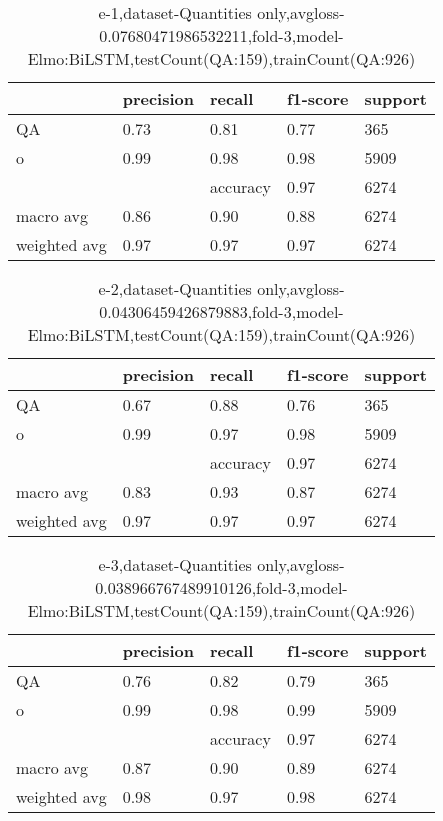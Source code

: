 \begin{table}[!ht] 
\centering
\caption{e-1,dataset-Quantities only,avgloss-0.07680471986532211,fold-3,model-Elmo:BiLSTM,testCount(QA:159),trainCount(QA:926)}\label{e-1data-quantS.tsv}
\begin{tabularx}{300pt}{|X|X|X|X|X|}
\hline
&precision&recall&f1-score&support\\
\hline
QA&0.73&0.81&0.77&365\\
\hline
o&0.99&0.98&0.98&5909\\
\hline
&&accuracy&0.97&6274\\
\hline
macro avg&0.86&0.90&0.88&6274\\
\hline
weighted avg&0.97&0.97&0.97&6274\\
\hline
\end{tabularx}
\end{table}
\begin{table}[!ht] 
\centering
\caption{e-2,dataset-Quantities only,avgloss-0.04306459426879883,fold-3,model-Elmo:BiLSTM,testCount(QA:159),trainCount(QA:926)}\label{e-2data-quantS.tsv}
\begin{tabularx}{300pt}{|X|X|X|X|X|}
\hline
&precision&recall&f1-score&support\\
\hline
QA&0.67&0.88&0.76&365\\
\hline
o&0.99&0.97&0.98&5909\\
\hline
&&accuracy&0.97&6274\\
\hline
macro avg&0.83&0.93&0.87&6274\\
\hline
weighted avg&0.97&0.97&0.97&6274\\
\hline
\end{tabularx}
\end{table}
\begin{table}[!ht] 
\centering
\caption{e-3,dataset-Quantities only,avgloss-0.038966767489910126,fold-3,model-Elmo:BiLSTM,testCount(QA:159),trainCount(QA:926)}\label{e-3data-quantS.tsv}
\begin{tabularx}{300pt}{|X|X|X|X|X|}
\hline
&precision&recall&f1-score&support\\
\hline
QA&0.76&0.82&0.79&365\\
\hline
o&0.99&0.98&0.99&5909\\
\hline
&&accuracy&0.97&6274\\
\hline
macro avg&0.87&0.90&0.89&6274\\
\hline
weighted avg&0.98&0.97&0.98&6274\\
\hline
\end{tabularx}
\end{table}
